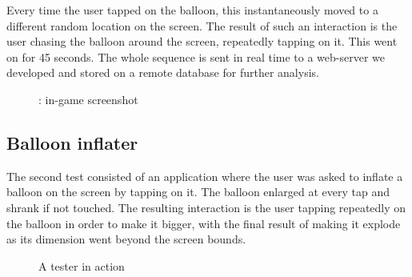 Every time the user tapped on the balloon, this instantaneously moved to a different random location on the screen. The result of such an interaction is the user chasing the balloon around the screen, repeatedly tapping on it. This went on for 45 seconds.
The whole sequence is sent in real time to a web-server we developed and stored on a remote database for further analysis.

\begin{figure}[h!t]
\label{fig:test1}
\centering
	{\setlength{\fboxsep}{0pt}
	 }
\caption{\testfirst: in-game screenshot}
\end{figure}

\subsection{Balloon inflater}
\label{sec:test2}
The second test consisted of an application where the user was asked to inflate a balloon on the screen by tapping on it.
The balloon enlarged at every tap and shrank if not touched.
The resulting interaction is the user tapping repeatedly on the balloon in order to make it bigger, with the final result of making it explode as its dimension went beyond the screen bounds.

\begin{figure}[h!t]
\label{fig:experiment}
\centering
	{\setlength{\fboxsep}{0pt}
	 }
\caption{A tester in action}
\end{figure}

